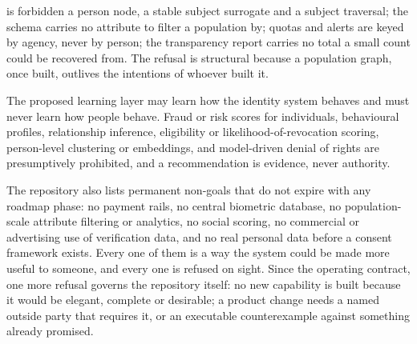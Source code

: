 \begin{description}
    is forbidden a person node, a stable subject surrogate and a subject traversal; the schema carries
    no attribute to filter a population by; quotas and alerts are keyed by agency, never by person;
    the transparency report carries no total a small count could be recovered from. The refusal is
    structural because a population graph, once built, outlives the intentions of whoever built it.
  \item[Machine learning must not turn identity infrastructure into scoring.] The proposed learning
    layer may learn how the identity system behaves and must never learn how people behave. Fraud
    or risk scores for individuals, behavioural profiles, relationship inference, eligibility or
    likelihood-of-revocation scoring, person-level clustering or embeddings, and model-driven denial
    of rights are presumptively prohibited, and a recommendation is evidence, never authority.
\end{description}

The repository also lists permanent non-goals that do not expire with any roadmap phase: no payment
rails, no central biometric database, no population-scale attribute filtering or analytics, no social
scoring, no commercial or advertising use of verification data, and no real personal data before a
consent framework exists. Every one of them is a way the system could be made more useful to someone,
and every one is refused on sight. Since the operating contract, one more refusal governs the
repository itself: no new capability is built because it would be elegant, complete or desirable; a
product change needs a named outside party that requires it, or an executable counterexample against
something already promised.

